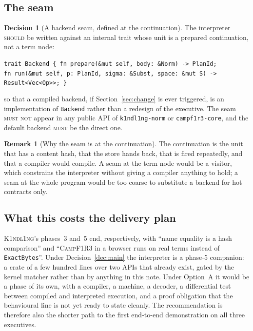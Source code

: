 \documentclass[11pt,a4paper]{article}
\newcommand{\code}[1]{\texttt{#1}}
\newcommand{\Kind}{\textsc{K1ndl1ng}}
\newcommand{\Camp}{\textsc{CampF1R3}}
\newcommand{\MUST}{\textsc{must}}
\newcommand{\MUSTNOT}{\textsc{must not}}
\newcommand{\SHOULD}{\textsc{should}}
\theoremstyle{definition}
\newtheorem{decision}[definition]{Decision}
\newtheorem{remark}[definition]{Remark}
\theoremstyle{plain}
\begin{document}
\subsection{The seam}

\begin{decision}[A backend seam, defined at the continuation]\label{dec:seam}
The interpreter \SHOULD{} be written against an internal trait whose unit is a
prepared continuation, not a term node:
\begin{center}\small
\code{trait Backend \{ fn prepare(\&mut self, body: \&Norm) -> PlanId;\\
\hspace*{2.6em} fn run(\&mut self, p: PlanId, sigma: \&Subst, space: \&mut S) -> Result<Vec<Op>>; \}}
\end{center}
so that a compiled backend, if Section~\ref{sec:change} is ever triggered, is an
implementation of \code{Backend} rather than a redesign of the executive. The
seam \MUSTNOT{} appear in any public API of \code{k1ndl1ng-norm} or
\code{campf1r3-core}, and the default backend \MUST{} be the direct one.
\end{decision}

\begin{remark}[Why the seam is at the continuation]
The continuation is the unit that has a content hash, that the store hands back,
that is fired repeatedly, and that a compiler would compile. A seam at the term
node would be a visitor, which constrains the interpreter without giving a
compiler anything to hold; a seam at the whole program would be too coarse to
substitute a backend for hot contracts only.
\end{remark}

\subsection{What this costs the delivery plan}

\Kind's phases~3 and~5 end, respectively, with ``name equality is a hash
comparison'' and ``\Camp{} in a browser runs on real terms instead of
\code{ExactBytes}''. Under Decision~\ref{dec:main} the interpreter is a
phase-5 companion: a crate of a few hundred lines over two APIs that already
exist, gated by the kernel matcher rather than by anything in this note. Under
Option~A it would be a phase of its own, with a compiler, a machine, a decoder,
a differential test between compiled and interpreted execution, and a proof
obligation that the behavioural line is not yet ready to state cleanly. The
recommendation is therefore also the shorter path to the first end-to-end
demonstration on all three executives.
\end{document}

